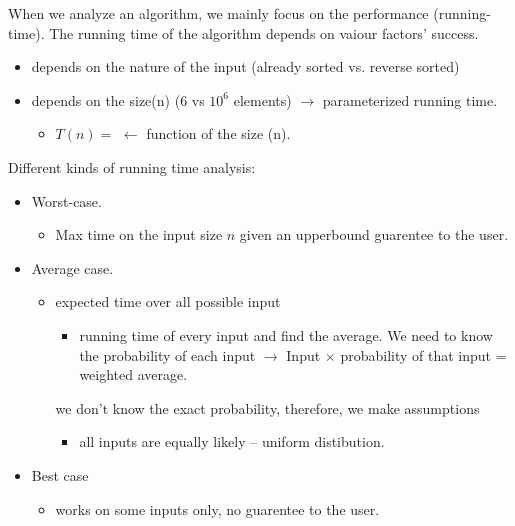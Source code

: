 \documentclass{article}
\begin{document}
    When we analyze an algorithm, we mainly focus on the performance (running-time). 
    The running time of the algorithm depends on vaiour factors' success.
    \begin{itemize}
        \item depends on the nature of the input (already sorted vs. reverse sorted)
        \item depends on the size(n) ($6$ vs $10^6$ elements) $\rightarrow$ parameterized 
        running time.
        \begin{itemize}
            \item $T(n)=$ $\leftarrow$ function of the size (n).
        \end{itemize}
    \end{itemize}
    Different kinds of running time analysis:
    \begin{itemize}
        \item Worst-case.
        \begin{itemize}
            \item Max time on the input size $n$ given an upperbound guarentee to the user.
        \end{itemize}
        \item Average case.
        \begin{itemize}
            \item expected time over all possible input 
            \begin{itemize}
                \item running time of every input and find the average. We need to know
                the probability of each input $\rightarrow$ Input $\times$
                probability of that input = weighted average.
            \end{itemize}
            we don't know the exact probability, therefore, we make assumptions
            \begin{itemize}
                \item all inputs are equally likely -- uniform distibution.
            \end{itemize}
        \end{itemize}
        \item Best case
        \begin{itemize}
            \item works on some inputs only, no guarentee to the user.
        \end{itemize}
    \end{itemize}
\end{document}
